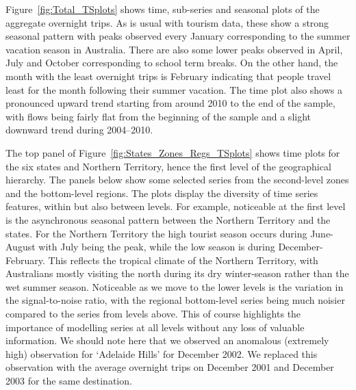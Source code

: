 \documentclass[12pt]{article}
\theoremstyle{definition}
\begin{document}
Figure~\ref{fig:Total_TSplots} shows time, sub-series and seasonal plots of the aggregate overnight trips. As is usual with tourism data, these show a strong seasonal pattern with peaks observed every January corresponding to the summer vacation season in Australia. There are also some lower peaks observed in April, July and October corresponding to school term breaks. On the other hand, the month with the least overnight trips is February indicating that people travel least for the month following their summer vacation. The time plot also shows a pronounced upward trend starting from around 2010 to the end of the sample, with flows being fairly flat from the beginning of the sample and a slight downward trend during 2004--2010.

The top panel of Figure~\ref{fig:States_Zones_Regs_TSplots} shows time plots for the six states and Northern Territory, hence the first level of the geographical hierarchy. The panels below show some selected series from the second-level zones and the bottom-level regions. The plots display the diversity of time series features, within but also between levels. For example, noticeable at the first level is the asynchronous seasonal pattern between the Northern Territory and the states. For the Northern Territory the high tourist season occurs during June-August with July being the peak, while the low season is during December-February. This reflects the tropical climate of the Northern Territory, with Australians mostly visiting the north during its dry winter-season rather than the wet summer season. Noticeable as we move to the lower levels is the variation in the signal-to-noise ratio, with the regional bottom-level series being much noisier compared to the series from levels above. This of course highlights the importance of modelling series at all levels without any loss of valuable information. We should note here that we observed an anomalous (extremely high) observation for `Adelaide Hills' for December 2002. We replaced this observation with the average overnight trips on December 2001 and December 2003 for the same destination.
\end{document}
